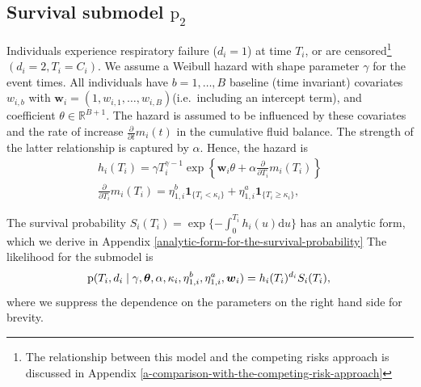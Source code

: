 \documentclass[
  10pt,
  a4paper,
]{article}
\newcommand{\pd}{\text{p}}
\begin{document}
\hypertarget{survival-submodel-pd_2}{%
\subsection{\texorpdfstring{Survival submodel
\(\pd_{2}\)}{Survival submodel \textbackslash pd\_\{2\}}}\label{survival-submodel-pd_2}}

Individuals experience respiratory failure (\(d_{i} = 1\)) at time
\(T_{i}\), or are censored\footnote{The relationship between this model
  and the competing risks approach is discussed in Appendix
  \ref{a-comparison-with-the-competing-risk-approach}}
\((d_{i} = 2, T_{i} = C_{i})\). We assume a Weibull hazard with shape
parameter \(\gamma\) for the event times. All individuals have
\(b = 1, \ldots, B\) baseline (time invariant) covariates \(w_{i, b}\)
with
\(\boldsymbol{w}_{i} = (1, w_{i, 1}, \ldots, w_{i, B})\)(i.e.~including
an intercept term), and coefficient \(\theta \in \mathbb{R}^{B + 1}\).
The hazard is assumed to be influenced by these covariates and the rate
of increase \(\frac{\partial}{\partial t} m_{i}(t)\) in the cumulative
fluid balance. The strength of the latter relationship is captured by
\(\alpha\). Hence, the hazard is \begin{gather}
  h_{i}(T_{i}) = \gamma T_{i}^{\gamma - 1} \exp\left\{\boldsymbol{w}_{i}\theta + \alpha \frac{\partial}{\partial T_{i}} m_{i}(T_{i})\right\} \\
  \frac{\partial}{\partial T_{i}} m_{i}(T_{i}) = \eta^{b}_{1, i}\boldsymbol{1}_{\{T_{i} < \kappa_{i}\}} + \eta^{a}_{1, i}\boldsymbol{1}_{\{T_{i} \geq \kappa_{i}\}},
\end{gather}

The survival probability
\(S_{i}(T_{i}) = \exp\{-\int_{0}^{T_{i}}h_{i}(u)\text{d}u\}\) has an
analytic form, which we derive in Appendix
\ref{analytic-form-for-the-survival-probability} The likelihood for the
submodel is \begin{equation}
  \pd(T_{i}, d_{i} \mid \gamma, \boldsymbol{\theta}, \alpha, \kappa_{i}, \eta_{1, i}^{b}, \eta_{1, i}^{a}, \boldsymbol{w}_{i}) = h_{i}(T_{i})^{d_{i}} S_{i}(T_{i}), \\
\end{equation} where we suppress the dependence on the parameters on the
right hand side for brevity.
\end{document}
